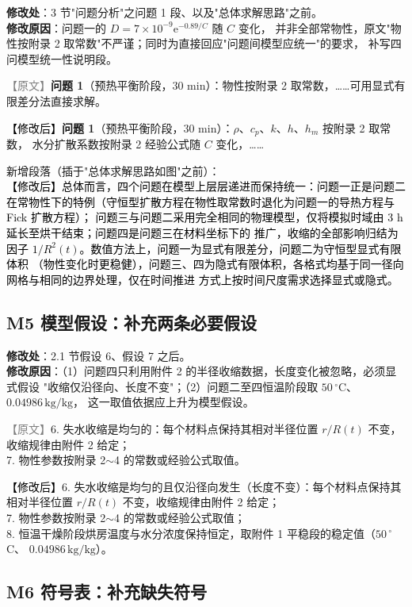 \documentclass[UTF8,zihao=-4]{ctexart}
\newcommand{\yuanduan}[1]{\par\noindent\textcolor{gray}{\small 【原文】}#1\par}
\newcommand{\xinduan}[1]{\par\noindent\textcolor{black}{\small 【修改后】}#1\par}
\begin{document}
\textbf{修改处}：3 节"问题分析"之问题 1 段、以及"总体求解思路"之前。\\
\textbf{修改原因}：问题一的 $D=7\times10^{-9}\mathrm{e}^{-0.89/C}$ 随 $C$ 变化，
并非全部常物性，原文"物性按附录 2 取常数"不严谨；同时为直接回应"问题间模型应统一"的要求，
补写四问模型统一性说明段。

\yuanduan{\textbf{问题 1}（预热平衡阶段，30 min）：物性按附录 2 取常数，……可用显式有限差分法直接求解。}
\xinduan{\textbf{问题 1}（预热平衡阶段，30 min）：$\rho$、$c_p$、$k$、$h$、$h_m$ 按附录 2 取常数，
水分扩散系数按附录 2 经验公式随 $C$ 变化，……}

新增段落（插于"总体求解思路如图"之前）：\\[2pt]
\noindent\textcolor{black}{\small 【修改后】总体而言，四个问题在模型上层层递进而保持统一：问题一正是问题二
在常物性下的特例（守恒型扩散方程在物性取常数时退化为问题一的导热方程与 Fick 扩散方程）；
问题三与问题二采用完全相同的物理模型，仅将模拟时域由 3 h 延长至烘干结束；问题四是问题三在材料坐标下的
推广，收缩的全部影响归结为因子 $1/R^2(t)$。数值方法上，问题一为显式有限差分，问题二为守恒型显式有限体积
（物性变化时更稳健），问题三、四为隐式有限体积，各格式均基于同一径向网格与相同的边界处理，仅在时间推进
方式上按时间尺度需求选择显式或隐式。}

\subsection*{M5 模型假设：补充两条必要假设}

\textbf{修改处}：2.1 节假设 6、假设 7 之后。\\
\textbf{修改原因}：（1）问题四只利用附件 2 的半径收缩数据，长度变化被忽略，必须显式假设
"收缩仅沿径向、长度不变"；（2）问题二至四恒温阶段取 $50\,{}^\circ$C、$0.04986\,\mathrm{kg/kg}$，
这一取值依据应上升为模型假设。

\yuanduan{6. 失水收缩是均匀的：每个材料点保持其相对半径位置 $r/R(t)$ 不变，收缩规律由附件 2 给定；\\
7. 物性参数按附录 2$\sim$4 的常数或经验公式取值。}
\xinduan{6. 失水收缩是均匀的且仅沿径向发生（长度不变）：每个材料点保持其相对半径位置
$r/R(t)$ 不变，收缩规律由附件 2 给定；\\
7. 物性参数按附录 2$\sim$4 的常数或经验公式取值；\\
8. 恒温干燥阶段烘房温度与水分浓度保持恒定，取附件 1 平稳段的稳定值（$50\,{}^\circ$C、
$0.04986\,\mathrm{kg/kg}$）。}

\subsection*{M6 符号表：补充缺失符号}
\end{document}
